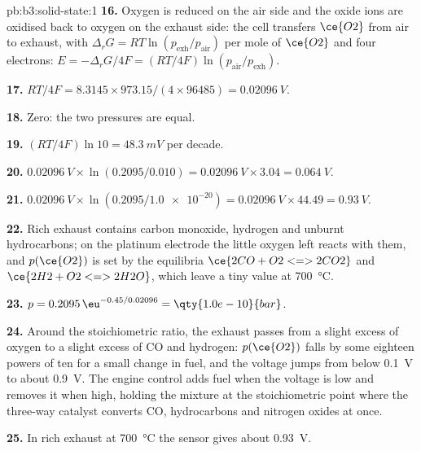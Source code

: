 \begin{solution}{pb:b3:solid-state:1}
\textbf{16.} Oxygen is reduced on the air side and the oxide ions are oxidised back
to oxygen on the exhaust side: the cell transfers $\ce{O2}$ from air to exhaust, with
$\Delta_rG = RT\ln(p_{\mathrm{exh}}/p_{\mathrm{air}})$ per mole of $\ce{O2}$ and four electrons: $E = -\Delta_rG/4F = (RT/4F)\ln(p_{\mathrm{air}}/p_{\mathrm{exh}})$.

\textbf{17.} $RT/4F = 8.3145 \times 973.15/(4 \times 96485) = \qty{0.02096}{V}$.

\textbf{18.} Zero: the two pressures are equal.

\textbf{19.} $(RT/4F)\ln 10 = \qty{48.3}{mV}$ per decade.

\textbf{20.} $\qty{0.02096}{V} \times \ln(0.2095/0.010) = \qty{0.02096}{V} \times 3.04 = \qty{0.064}{V}$.

\textbf{21.} $\qty{0.02096}{V} \times \ln(0.2095/\num{1.0e-20}) = \qty{0.02096}{V} \times 44.49 = \qty{0.93}{V}$.

\textbf{22.} Rich exhaust contains carbon monoxide, hydrogen and unburnt
hydrocarbons; on the platinum electrode the little oxygen left reacts with them,
and $p(\ce{O2})$ is set by the equilibria $\ce{2CO + O2 <=> 2CO2}$ and $\ce{2H2 + O2 <=> 2H2O}$, which leave a tiny
value at \qty{700}{\celsius}.

\textbf{23.} $p = 0.2095\,\eu^{-0.45/0.02096} = \qty{1.0e-10}{bar}$.

\textbf{24.} Around the stoichiometric ratio, the exhaust passes from a slight excess
of oxygen to a slight excess of CO and hydrogen: $p(\ce{O2})$ falls by some eighteen
powers of ten for a small change in fuel, and the voltage jumps from below
\qty{0.1}{V} to about \qty{0.9}{V}. The engine control adds fuel when the voltage is low and
removes it when high, holding the mixture at the stoichiometric point where the
three-way catalyst converts CO, hydrocarbons and nitrogen oxides at once.

\textbf{25.} In rich exhaust at \qty{700}{\celsius} the sensor gives about \qty{0.93}{V}.
\end{solution}
